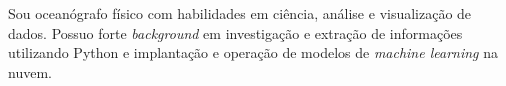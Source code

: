 \documentclass[9pt]{developercv} %
\begin{document}

\begin{minipage}[t]{1\textwidth} %
Sou oceanógrafo físico com habilidades em ciência, análise e visualização de dados. Possuo forte \textit{background} em investigação e extração de informações utilizando Python e implantação e operação de modelos de \textit{machine learning} na nuvem. 
\end{minipage}
\hspace{0.3cm}
\hfill %

\begin{center}
\end{center}

\vspace{-0.2cm}
\end{document}
